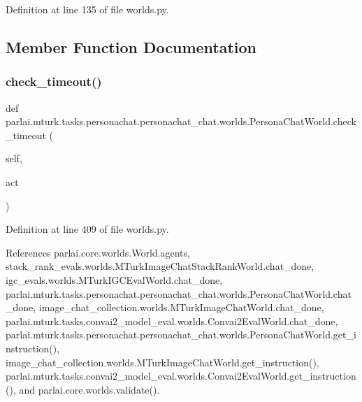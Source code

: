 Definition at line 135 of file worlds.\+py.



\subsection{Member Function Documentation}
\mbox{\label{classparlai_1_1mturk_1_1tasks_1_1personachat_1_1personachat__chat_1_1worlds_1_1PersonaChatWorld_a2d3f943d1fd0d1bff5af9fdcae160439}} 
\subsubsection{\texorpdfstring{check\+\_\+timeout()}{check\_timeout()}}
{\footnotesize\ttfamily def parlai.\+mturk.\+tasks.\+personachat.\+personachat\+\_\+chat.\+worlds.\+Persona\+Chat\+World.\+check\+\_\+timeout (\begin{DoxyParamCaption}\item[{}]{self,  }\item[{}]{act }\end{DoxyParamCaption})}



Definition at line 409 of file worlds.\+py.



References parlai.\+core.\+worlds.\+World.\+agents, stack\+\_\+rank\+\_\+evals.\+worlds.\+M\+Turk\+Image\+Chat\+Stack\+Rank\+World.\+chat\+\_\+done, igc\+\_\+evals.\+worlds.\+M\+Turk\+I\+G\+C\+Eval\+World.\+chat\+\_\+done, parlai.\+mturk.\+tasks.\+personachat.\+personachat\+\_\+chat.\+worlds.\+Persona\+Chat\+World.\+chat\+\_\+done, image\+\_\+chat\+\_\+collection.\+worlds.\+M\+Turk\+Image\+Chat\+World.\+chat\+\_\+done, parlai.\+mturk.\+tasks.\+convai2\+\_\+model\+\_\+eval.\+worlds.\+Convai2\+Eval\+World.\+chat\+\_\+done, parlai.\+mturk.\+tasks.\+personachat.\+personachat\+\_\+chat.\+worlds.\+Persona\+Chat\+World.\+get\+\_\+instruction(), image\+\_\+chat\+\_\+collection.\+worlds.\+M\+Turk\+Image\+Chat\+World.\+get\+\_\+instruction(), parlai.\+mturk.\+tasks.\+convai2\+\_\+model\+\_\+eval.\+worlds.\+Convai2\+Eval\+World.\+get\+\_\+instruction(), and parlai.\+core.\+worlds.\+validate().



